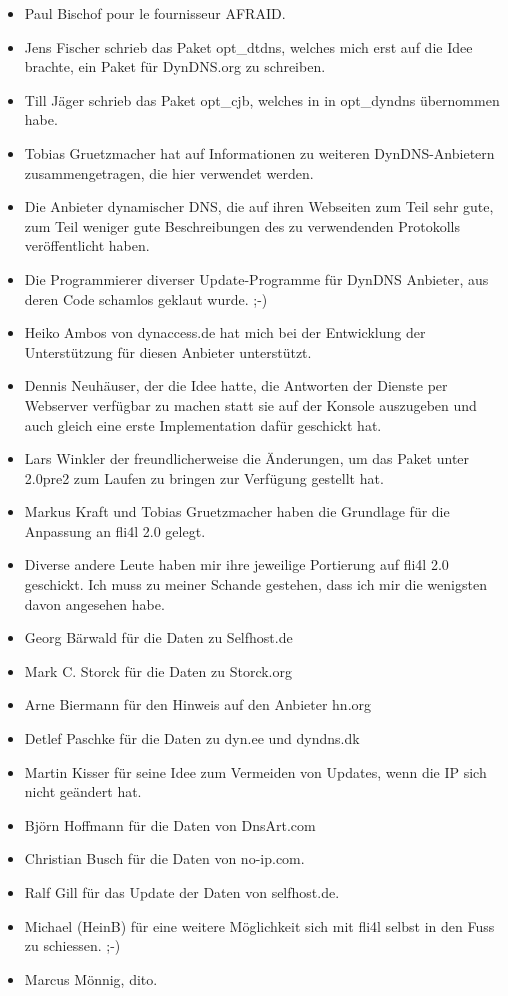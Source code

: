 \begin{itemize}
\item Paul Bischof pour le fournisseur AFRAID.
\item Jens Fischer schrieb das Paket opt\_dtdns, welches mich erst auf die
  Idee brachte, ein Paket für DynDNS.org zu schreiben.
\item Till Jäger schrieb das Paket opt\_cjb, welches in in opt\_dyndns
  übernommen habe.
\item Tobias Gruetzmacher hat auf  Informationen zu
  weiteren DynDNS-Anbietern zusammengetragen, die hier verwendet werden.
\item Die Anbieter dynamischer DNS, die auf ihren Webseiten zum Teil sehr
  gute, zum Teil weniger gute Beschreibungen des zu verwendenden Protokolls
  veröffentlicht haben.
\item Die Programmierer diverser Update-Programme für DynDNS Anbieter, aus
  deren Code schamlos geklaut wurde. ;-)
\item Heiko Ambos von dynaccess.de hat mich bei der Entwicklung der
  Unterstützung für diesen Anbieter unterstützt.
\item Dennis Neuhäuser, der die Idee hatte, die Antworten der Dienste per
  Webserver verfügbar zu machen statt sie auf der Konsole auszugeben
  und auch gleich eine erste Implementation dafür geschickt hat.
\item Lars Winkler der freundlicherweise die Änderungen, um das Paket unter
  2.0pre2 zum Laufen zu bringen zur Verfügung gestellt hat.
\item Markus Kraft und Tobias Gruetzmacher haben die Grundlage für die
  Anpassung an fli4l 2.0 gelegt.
\item Diverse andere Leute haben mir ihre jeweilige Portierung auf fli4l 2.0
  geschickt. Ich muss zu meiner Schande gestehen, dass ich mir die wenigsten
  davon angesehen habe.
\item Georg Bärwald für die Daten zu Selfhost.de
\item Mark C. Storck für die Daten zu Storck.org
\item Arne Biermann für den Hinweis auf den Anbieter hn.org
\item Detlef Paschke für die Daten zu dyn.ee und dyndns.dk
\item Martin Kisser für seine Idee zum Vermeiden von Updates, wenn die
  IP sich nicht geändert hat.
\item Björn Hoffmann für die Daten von DnsArt.com
\item Christian Busch für die Daten von no-ip.com.
\item Ralf Gill für das Update der Daten von selfhost.de.
\item Michael (HeinB) für eine weitere Möglichkeit sich mit fli4l selbst
  in den Fuss zu schiessen. ;-)
\item Marcus Mönnig, dito.
\end{itemize}

